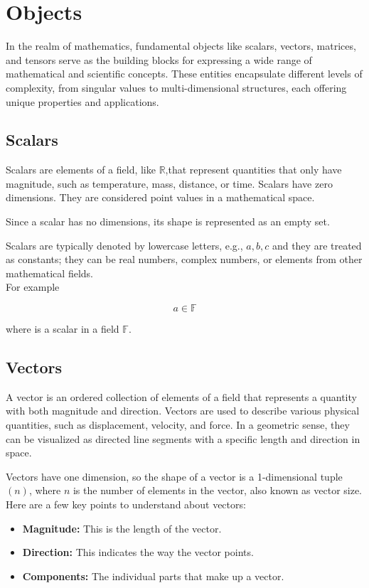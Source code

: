 \section{Objects}
In the realm of mathematics, fundamental objects like scalars, vectors, matrices, and tensors serve as the building blocks for expressing a wide range of mathematical and scientific concepts. These entities encapsulate different levels of complexity, from singular values to multi-dimensional structures, each offering unique properties and applications.

\subsection{Scalars}
Scalars are elements of a field, like $\mathbb{R}$,that represent quantities that only have magnitude, such as temperature, mass, distance, or time. Scalars have zero dimensions. They are considered point values in a mathematical space.

Since a scalar has no dimensions, its shape is represented as an empty set.

Scalars are typically denoted by lowercase letters, e.g., $a,b,c$ and they are treated as constants; they can be real numbers, complex numbers, or elements from other mathematical fields.
\\

For example 

$$
a \in \mathbb{F}
$$

where is a scalar in a field $\mathbb{F}$.

\subsection{Vectors}
A vector is an ordered collection of elements of a field that represents a quantity with both magnitude and direction. Vectors are used to describe various physical quantities, such as displacement, velocity, and force.
In a geometric sense, they can be visualized as directed line segments with a specific length and direction in space.

Vectors have one dimension, so the shape of a vector is a 1-dimensional tuple $(n)$, where $n$ is the number of elements in the vector, also known as vector size. 
\\

Here are a few key points to understand about vectors:
\begin{itemize}
    \item \textbf{Magnitude:} This is the length of the vector.

    \item \textbf{Direction:} This indicates the way the vector points.

    \item \textbf{Components:} The individual parts that make up a vector.
\end{itemize}


